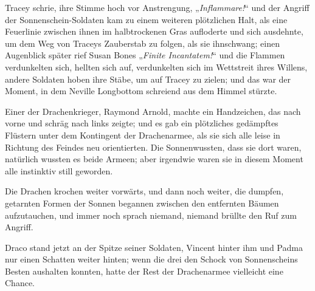 Tracey schrie, ihre Stimme hoch vor Anstrengung, „\emph{Inflammare!}“ und der Angriff der Sonnenschein-Soldaten kam zu einem weiteren plötzlichen Halt, als eine Feuerlinie zwischen ihnen im halbtrockenen Gras aufloderte und sich ausdehnte, um dem Weg von Traceys Zauberstab zu folgen, als sie ihnschwang; einen Augenblick später rief Susan Bones „\emph{Finite Incantatem!}“ und die Flammen verdunkelten sich, hellten sich auf, verdunkelten sich im Wettstreit ihres Willens, andere Soldaten hoben ihre Stäbe, um auf Tracey zu zielen; und das war der Moment, in dem Neville Longbottom schreiend aus dem Himmel stürzte.

\later

Einer der Drachenkrieger, Raymond Arnold, machte ein Handzeichen, das nach vorne und schräg nach links zeigte; und es gab ein plötzliches gedämpftes Flüstern unter dem Kontingent der Drachenarmee, als sie sich alle leise in Richtung des Feindes neu orientierten. Die Sonnenwussten, dass sie dort waren, natürlich wussten es beide Armeen; aber irgendwie waren sie in diesem Moment alle instinktiv still geworden.

Die Drachen krochen weiter vorwärts, und dann noch weiter, die dumpfen, getarnten Formen der Sonnen begannen zwischen den entfernten Bäumen aufzutauchen, und immer noch sprach niemand, niemand brüllte den Ruf zum Angriff.

Draco stand jetzt an der Spitze seiner Soldaten, Vincent hinter ihm und Padma nur einen Schatten weiter hinten; wenn die drei den Schock von Sonnenscheins Besten aushalten konnten, hatte der Rest der Drachenarmee vielleicht eine Chance.

